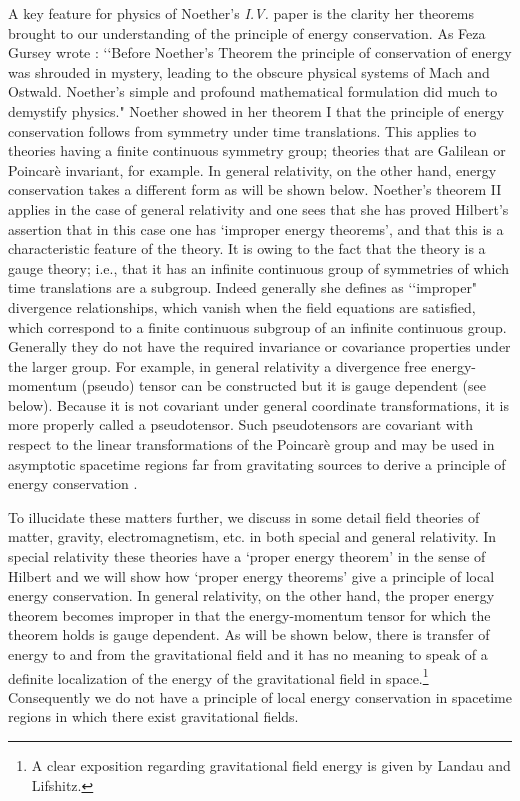 \documentclass[12pt]{article}
\begin{document}
A key feature for physics of Noether's {\it{I.V.}} paper is the clarity 
 her theorems brought to our understanding of the principle of
energy conservation. As Feza Gursey wrote \cite{feza}: \lq\lq Before Noether's Theorem the principle of conservation of energy was shrouded in
      mystery, leading to the obscure physical systems of Mach and Ostwald. Noether's simple and
      profound mathematical formulation did much to demystify physics."
Noether showed in her theorem I that the principle of energy conservation follows
from symmetry under time translations. This applies to theories
having a finite continuous symmetry group; theories that are Galilean or
Poincar\`{e} invariant, for example.
In general relativity,
on the other hand, 
energy conservation takes a different form as will be shown
below. Noether's theorem II applies in the case of general relativity
and one sees that she has proved Hilbert's assertion that in this case one
has  `improper energy theorems', and that this is a characteristic
feature of the theory.  It is owing to the fact that the  
theory is a gauge theory; i.e., that it has an infinite continuous
group of symmetries of which time translations are a subgroup. Indeed 
generally she defines as \lq\lq improper"
 divergence relationships, which vanish when the field equations are satisfied, 
which  correspond to a finite continuous subgroup of an infinite continuous group.
Generally they
do not have the required invariance or covariance properties under the
larger group. For example,
in general relativity a divergence
free energy-momentum (pseudo) tensor can be constructed but it is
gauge dependent (see below). Because  it is not covariant under general coordinate
transformations, it is more properly called  a pseudotensor. 
Such pseudotensors are covariant with respect to the linear transformations of the Poincar\`{e} group and may be used
in  asymptotic spacetime regions far from gravitating sources to derive a principle of
energy conservation \cite{c&w}.


To illucidate these matters further, we discuss in some detail 
  field theories of matter, gravity, electromagnetism, etc. in both
special and general relativity.  In special relativity these theories have a
`proper energy theorem' in the sense of Hilbert and we will show how `proper energy theorems' give a
principle of
local energy conservation.   In general relativity, on the other hand,
the proper energy theorem becomes improper in that the energy-momentum
tensor for which the theorem holds is gauge dependent. As will be shown
below,
there is transfer
of energy to and from the gravitational field and it has no meaning
to speak of a definite localization
of the energy of the gravitational field in space.\footnote{A 
clear exposition regarding gravitational field energy is given by Landau and Lifshitz\cite{L&L}.} Consequently we do not have a principle of local
energy conservation in spacetime regions in which there exist gravitational
fields.
\end{document}
